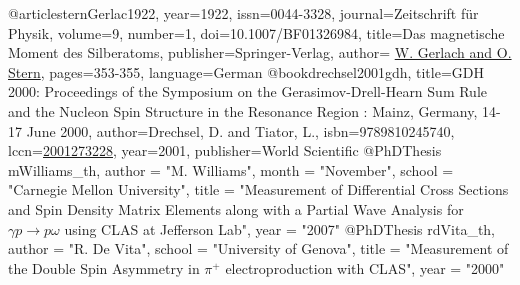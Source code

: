 @article{sternGerlac1922,
year={1922},
issn={0044-3328},
journal={Zeitschrift für Physik},
volume={9},
number={1},
doi={10.1007/BF01326984},
title={Das magnetische Moment des Silberatoms},
publisher={Springer-Verlag},
author={ \href{http://dx.doi.org/10.1007/BF01326984}{W. Gerlach  and O. Stern}},
pages={353-355},
language={German}
}
@book{drechsel2001gdh,
  title={GDH 2000: Proceedings of the Symposium on the Gerasimov-Drell-Hearn Sum Rule and the Nucleon Spin Structure in the Resonance Region : Mainz, Germany, 14-17 June 2000},
  author={Drechsel, D. and Tiator, L.},
  isbn={9789810245740},
  lccn={\href{http://books.google.com/books?id=-\_2Wg8lHIucC}{2001273228}},
  year={2001},
  publisher={World Scientific}
}      
@PhDThesis{ mWilliams_th,
	author = "M. Williams",
	month = "November",
	school = "Carnegie Mellon University",
	title = "{Measurement of Differential Cross Sections and Spin Density Matrix Elements along with a Partial Wave Analysis for $\gamma p \rightarrow p\omega$ using CLAS at Jefferson Lab}",
	year = "2007"
}
@PhDThesis{ rdVita_th,
	author = "R. De Vita",
	school = "University of Genova",
	title = "{Measurement of the Double Spin Asymmetry in $\pi^+$ electroproduction with CLAS}",
	year = "2000"
}
